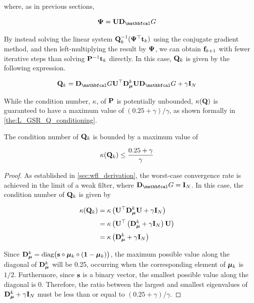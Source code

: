 where, as in previous sections, 

\begin{equation*}
    \PSI = \U \D_\Gt
\end{equation*}

By instead solving the linear system $\mathbf{Q}_k^{-1} (\mathbf{\Psi}^\top \mathbf{t}_k)$ using the conjugate gradient method, and then left-multiplying the result by $\mathbf{\Psi}$, we can obtain $\mathbf{f}_{k+1}$ with fewer iterative steps than solving $\mathbf{P}^{-1} \mathbf{t}_k$ directly. In this case, $\mathbf{Q}_k$ is given by the following expression. 

\begin{equation}
    \label{eq:Q_LGSR}
    \Q_k = \D_\Gt \U^\top \D_{\muu}^k \U \D_\Gt + \gamma \I_N
\end{equation}

While the condition number, $\kappa$, of $\mathbf{P}$ is potentially unbounded, $\kappa(\mathbf{Q})$ is guaranteed to have a maximum value of $(0.25 + \gamma) / \gamma$, as shown formally in \cref{the:L_GSR_Q_conditioning}. 

\begin{theorem}
    \label{the:L_GSR_Q_conditioning}
    
    The condition number of $\mathbf{Q}_k$ is bounded by a maximum value of 
    
    \begin{equation}
        \kappa(\mathbf{Q}_k) \leq \frac{0.25 + \gamma}{\gamma}
    \end{equation}

\end{theorem}

\begin{proof}
    As established in \cref{sec:wfl_derivation}, the worst-case convergence rate is achieved in the limit of a weak filter, where $\D_\Gt = \I_N$. In this case, the condition number of $\mathbf{Q}_k$ is given by 

    \begin{align*}
        \kappa(\mathbf{Q}_k) &= \kappa\left( \mathbf{U}^\top \mathbf{D}_{\boldsymbol{\mu}}^k \mathbf{U} + \gamma \mathbf{I}_N\right) \\[0.1cm]
        &=  \kappa\left( \mathbf{U}^\top \left(\mathbf{D}_{\boldsymbol{\mu}}^k + \gamma \mathbf{I}_N\right) \mathbf{U}  \right) \\[0.1cm]
        &= \kappa\left( \mathbf{D}_{\boldsymbol{\mu}}^k + \gamma \mathbf{I}_N\right)
    \end{align*}

    Since $\mathbf{D}_{\boldsymbol{\mu}}^k = \text{diag}\big(\mathbf{s} \circ \boldsymbol{\mu}_k \circ (\mathbf{1} - \boldsymbol{\mu}_k)\big)$, the maximum possible value along the diagonal of $\mathbf{D}_{\boldsymbol{\mu}}^k$ will be 0.25, occurring when the corresponding element of $\boldsymbol{\mu}_k$ is $1/2$. Furthermore, since $\mathbf{s}$ is a binary vector, the smallest possible value along the diagonal is 0. Therefore, the ratio between the largest and smallest eigenvalues of $ \mathbf{D}_{\boldsymbol{\mu}}^k + \gamma \mathbf{I}_N$ must be less than or equal to $(0.25 + \gamma) / \gamma$. 
\end{proof}




